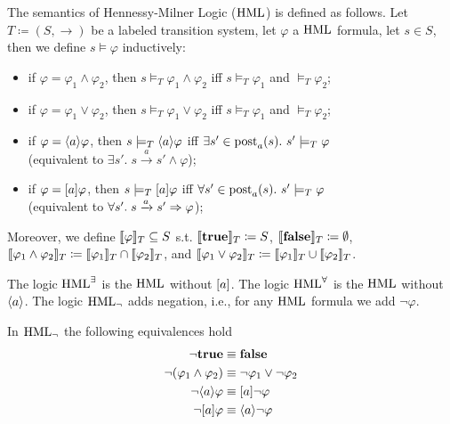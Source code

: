 \begin{definition}
    The semantics of Hennessy-Milner Logic ($\operatorname{HML}$) is defined as follows. 
    Let $T\coloneqq (S, \to)$ be a labeled transition system, let $\varphi$ a $\operatorname{HML}$ formula, let $s\in S$, then we define $s\models \varphi$ inductively:
    \begin{itemize}[noitemsep]
        \item if $ \varphi = \varphi_1 \land \varphi_2 $, then $ s \models_T \varphi_1 \land \varphi_2$ iff $s \models_T \varphi_1$ and  $\models_T \varphi_2$;
        \item if $ \varphi = \varphi_1 \lor \varphi_2 $, then $ s \models_T \varphi_1 \lor \varphi_2$ iff $s \models_T \varphi_1$ and  $\models_T \varphi_2$;
      \item if $ \varphi = \langle a \rangle\varphi $, then $ s \models_T\langle a \rangle\varphi $ iff $\exists s' \in \operatorname{post}_a(s).\ s' \models_T \varphi$ \\
      (equivalent to $\exists s' .\; s \xrightarrow{a} s' \land  \varphi$); 
    \item if $ \varphi = [ a ]\varphi $, then $ s \models_T[ a ]\varphi $ iff $\forall s' \in \operatorname{post}_a(s).\ s' \models_T \varphi$ \\
      (equivalent to $\forall s' .\; s \xrightarrow{a} s' \Rightarrow  \varphi$); 
    \end{itemize}
    Moreover, we define $\llbracket \varphi \rrbracket_T\subseteq S$ s.t. $\llbracket \mathbf{true} \rrbracket_T\coloneqq S$, $\llbracket \mathbf{false} \rrbracket_T \coloneqq  \emptyset$, $\llbracket \varphi_1 \land \varphi_2 \rrbracket_T \coloneqq  \llbracket \varphi_1  \rrbracket_T \cap \llbracket \varphi_2 \rrbracket_T$, and $\llbracket \varphi_1 \lor \varphi_2 \rrbracket_T \coloneqq  \llbracket \varphi_1  \rrbracket_T \cup \llbracket \varphi_2 \rrbracket_T$.
\end{definition}

\begin{definition}
     The logic $\operatorname{HML}^\exists$ is the $\operatorname{HML}$ without $[ a ]$. The logic $\operatorname{HML} ^\forall$ is the $\operatorname{HML}$ without $\langle a \rangle$. The logic $\operatorname{HML}_\neg$ adds negation, i.e., for any $\operatorname{HML}$ formula we add $\neg \varphi$.
\end{definition}

\begin{lemma}
    In $\operatorname{HML}_{\neg}$ the following equivalences hold
    \begin{align*}
        \neg \mathbf{true} &\equiv \mathbf{false} \\
        \neg (\varphi_1 \land \varphi_2) &\equiv \neg \varphi_1 \lor \neg\varphi_2 \\
        \neg \langle a \rangle\varphi &\equiv [ a ]\neg \varphi \\
        \neg [ a ]\varphi &\equiv \langle a \rangle\neg \varphi \\
    \end{align*}
\end{lemma}


